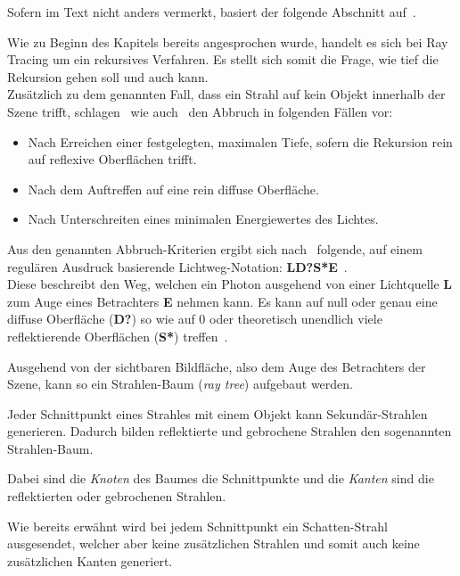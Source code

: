 Sofern im Text nicht anders vermerkt, basiert der folgende Abschnitt
auf~\cite[S. 16 bis 17]{glassner_introduction_1989}.

Wie zu Beginn des Kapitels bereits angesprochen wurde, handelt es sich
bei Ray Tracing um ein rekursives Verfahren. Es stellt sich somit die
Frage, wie tief die Rekursion gehen soll und auch kann.\\
Zusätzlich zu dem genannten Fall, dass ein Strahl auf kein Objekt
innerhalb der Szene trifft, schlagen~\citeauthor{whitted_improved_1980}
wie auch~\citeauthor{glassner_introduction_1989} den Abbruch in
folgenden Fällen vor:
\begin{itemize}
        \item{Nach Erreichen einer festgelegten, maximalen Tiefe},
            sofern die Rekursion rein auf reflexive Oberflächen trifft.
        \item{Nach dem Auftreffen auf eine rein diffuse Oberfläche.}
        \item{Nach Unterschreiten eines minimalen Energiewertes des
                Lichtes.}
\end{itemize}

Aus den genannten Abbruch-Kriterien ergibt sich
nach~\citeauthor{heckbert_adaptive_1990} folgende, auf einem regulären
Ausdruck basierende Lichtweg-Notation:
\textbf{LD?S*E}~\parencite{heckbert_adaptive_1990}.\\ Diese beschreibt
den Weg, welchen ein Photon ausgehend von einer Lichtquelle \textbf{L}
zum Auge eines Betrachters \textbf{E} nehmen kann. Es kann auf null oder
genau eine diffuse Oberfläche (\textbf{D?}) so wie auf 0 oder
theoretisch unendlich viele reflektierende Oberflächen (\textbf{S*})
treffen~\parencite[S. 148]{heckbert_adaptive_1990}.

Ausgehend von der sichtbaren Bildfläche, also dem Auge des Betrachters
der Szene, kann so ein Strahlen-Baum (\textit{ray tree}) aufgebaut
werden.

Jeder Schnittpunkt eines Strahles mit einem Objekt kann
Sekundär-Strahlen generieren. Dadurch bilden reflektierte und gebrochene
Strahlen den sogenannten Strahlen-Baum.

Dabei sind die \textit{Knoten} des Baumes die Schnittpunkte und die
\textit{Kanten} sind die reflektierten oder gebrochenen Strahlen.

Wie bereits erwähnt wird bei jedem Schnittpunkt ein Schatten-Strahl
ausgesendet, welcher aber keine zusätzlichen Strahlen und somit auch
keine zusätzlichen Kanten generiert.

